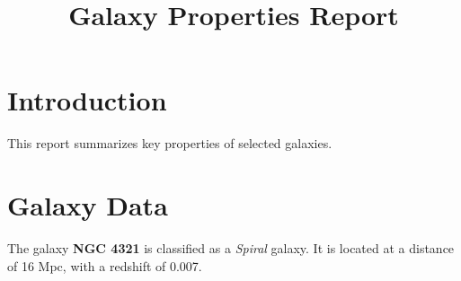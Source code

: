 \documentclass{article}
\title{Galaxy Properties Report}
\author{}
\date{}
\begin{document}
\maketitle

\section{Introduction}
This report summarizes key properties of selected galaxies.

\section{Galaxy Data}
The galaxy \textbf{NGC 4321} is classified as a \textit{Spiral} galaxy. 
It is located at a distance of 16 Mpc, with a redshift of 0.007.
\end{document}
